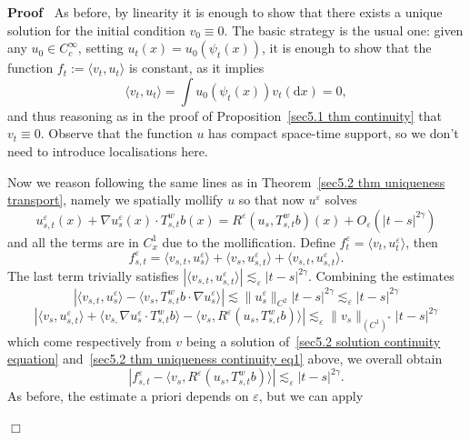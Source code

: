 \documentclass[10pt]{article}
\newcommand{\assign}{:=}
\newcommand{\mathd}{\mathrm{d}}
\newenvironment{proof}{\noindent\textbf{Proof\ }}{\hspace*{\fill}$\Box$\medskip}
\begin{document}
\begin{proof}
  As before, by linearity it is enough to show that there exists a unique
  solution for the initial condition $v_0 \equiv 0$. The basic strategy is the
  usual one: given any $u_0 \in C^{\infty}_c$, setting $u_t (x) = u_0 (\psi_t
  (x))$, it is enough to show that the function $f_t \assign \langle v_t, u_t
  \rangle$ is constant, as it implies
  \[ \langle v_t, u_t \rangle = \int u_0 (\psi_t (x)) v_t (\mathd x) = 0, \]
  and thus reasoning as in the proof of Proposition~\ref{sec5.1 thm
  continuity} that $v_t \equiv 0$. Observe that the function $u$ has compact
  space-time support, so we don't need to introduce localisations here.
  
  Now we reason following the same lines as in Theorem~\ref{sec5.2 thm
  uniqueness transport}, namely we spatially mollify $u$ so that now
  $u^{\varepsilon}$ solves
  \begin{equation}
    u^{\varepsilon}_{s, t} (x) + \nabla u^{\varepsilon}_s (x) \cdot T^w_{s, t}
    b (x) = R^{\varepsilon} (u_s, T^w_{s, t} b) (x) + O_{\varepsilon} (| t - s
    |^{2 \gamma}) \label{sec5.2 thm uniqueness continuity eq1}
  \end{equation}
  and all the terms are in $C^1_x$ due to the mollification. Define
  $f^{\varepsilon}_t = \langle v_t, u^{\varepsilon}_t \rangle$, then
  \[ f^{\varepsilon}_{s, t} = \langle v_{s, t}, u^{\varepsilon}_s \rangle +
     \langle v_s, u^{\varepsilon}_{s, t} \rangle + \langle v_{s, t},
     u^{\varepsilon}_{s, t} \rangle . \]
  The last term trivially satisfies $| \langle v_{s, t}, u^{\varepsilon}_{s,
  t} \rangle | \lesssim_{\varepsilon} | t - s |^{2 \gamma}$. Combining the
  estimates
  \[ | \langle v_{s, t}, u^{\varepsilon}_s \rangle - \langle v_s, T^w_{s, t} b
     \cdot \nabla u^{\varepsilon}_s \rangle | \lesssim \| u^{\varepsilon}_s
     \|_{C^2} | t - s |^{2 \gamma} \lesssim_{\varepsilon} | t - s |^{2 \gamma}
  \]
  \[ | \langle v_s, u^{\varepsilon}_{s, t} \rangle + \langle v_{s,} \nabla
     u^{\varepsilon}_s \cdot T^w_{s, t} b \rangle - \langle v_s,
     R^{\varepsilon} (u_s, T^w_{s, t} b) \rangle | \lesssim_{\varepsilon} \|
     v_s \|_{(C^1)^{\ast}} | t - s |^{2 \gamma} \]
  which come respectively from $v$ being a solution of~{\eqref{sec5.2 solution
  continuity equation}} and~{\eqref{sec5.2 thm uniqueness continuity eq1}}
  above, we overall obtain
  \[ | f^{\varepsilon}_{s, t} - \langle v_s, R^{\varepsilon} (u_s, T^w_{s, t}
     b) \rangle | \lesssim_{\varepsilon} | t - s |^{2 \gamma} . \]
  As before, the estimate a priori depends on $\varepsilon$, but we can apply

\end{proof}
\end{document}
